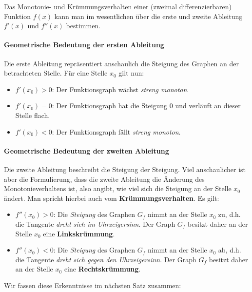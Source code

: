 \documentclass[ngerman, 12pt]{nssheetxea}
\begin{document}

Das Monotonie- und Krümmungsverhalten einer (zweimal differenzierbaren) Funktion $f(x)$ kann man im wesentlichen über die erste und zweite Ableitung $f'(x)$ und $f''(x)$ bestimmen.
\paragraph{Geometrische Bedeutung der ersten Ableitung} Die erste Ableitung repräsentiert anschaulich die Steigung des Graphen an der betrachteten Stelle. Für eine Stelle $x_0$ gilt nun:
\begin{itemize}
\item $f'(x_0)>0$: Der Funktionsgraph wächst \textit{streng monoton}.
\item $f'(x_0)=0$: Der Funktionsgraph hat die Steigung $0$ und verläuft an dieser Stelle flach.
\item $f'(x_0)<0$: Der Funktionsgraph fällt \textit{streng monoton}.
\end{itemize}
\paragraph{Geometrische Bedeutung der zweiten Ableitung} Die zweite Ableitung beschreibt \glqq die Steigung der Steigung\grqq. Viel anschaulicher ist aber die Formulierung, dass die zweite Ableitung die Änderung des Monotonieverhaltens ist, also angibt, wie viel sich die Steigung an der Stelle $x_0$ ändert. Man spricht hierbei auch vom \textbf{Krümmungsverhalten}. Es gilt:

\begin{itemize}
\item $f''(x_0)>0$: Die \textit{Steigung} des Graphen $G_f$ nimmt an der Stelle $x_0$ zu, d.h. die Tangente \textit{dreht sich im Uhrzeigersinn}. Der Graph $G_f$ besitzt daher an der Stelle $x_0$ eine \textbf{Linkskrümmung}.
\item $f''(x_0)<0$: Die \textit{Steigung} des Graphen $G_f$ nimmt an der Stelle $x_0$ ab, d.h. die Tangente \textit{dreht sich gegen den Uhrzeigersinn}. Der Graph $G_f$ besitzt daher an der Stelle $x_0$ eine \textbf{Rechtskrümmung}.
\end{itemize}
Wir fassen diese Erkenntnisse im nächsten Satz zusammen:
\end{document}
